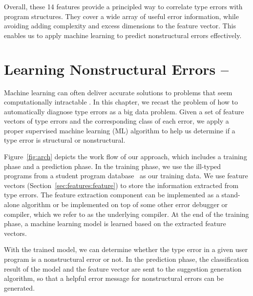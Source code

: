 \documentclass[12pt]{report}	%
\begin{document}
%
Overall, these 14 features provide a 
principled way to correlate type errors with
program structures.
They cover a wide array of useful error information, 
while avoiding adding complexity and 
excess dimensions to the feature vector.
This enables us to apply machine learning
to predict nonstructural errors effectively.

\chapter{Learning Nonstructural Errors -- \newCompiler}
\label{sec:solution}

Machine learning can often deliver accurate solutions to problems
that seem computationally intractable \cite{Moitra14:AAML,Harmeling00solvingsatisfiability}.
In this chapter, we recast the problem of how to automatically diagnose type errors as a big data problem.
Given a set of feature vectors of type errors and the corresponding class of each error,
we apply a proper supervised machine learning (ML) algorithm to help us 
determine if a type error is structural or nonstructural.


Figure~\ref{fig:arch} depicts the work flow of our approach, 
which includes a training phase and a prediction phase.
%
In the training phase, 
we use the ill-typed programs from a student program database~\cite{Hage09:Neon} 
as our training data. 
We use feature vectors (Section~\ref{sec:features:feature}) to store the information extracted from type errors.
The feature extraction component
can be implemented as a stand-alone algorithm or be implemented
on top of some other error debugger or compiler, which we refer to as the
underlying compiler. 
At the end of the training phase,
a machine learning model is learned 
based on the extracted feature vectors.

With the trained model, 
we can determine whether 
the type error in a given user program
is a nonstructural error or not.
In the prediction phase,
the classification result of the model
and the feature vector are sent to the
suggestion generation algorithm, 
so that a helpful error message
for nonstructural errors
can be generated.
\end{document}
